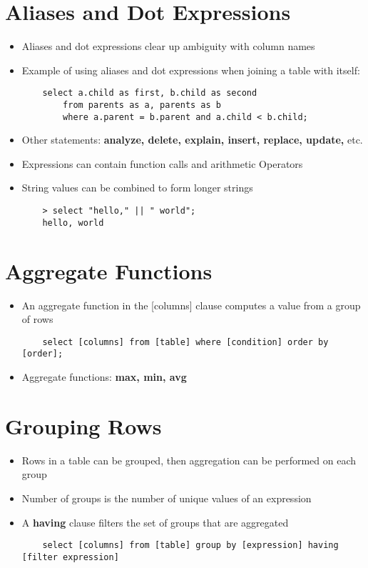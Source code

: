 \section{Aliases and Dot Expressions}
\begin{itemize}
    \item Aliases and dot expressions clear up ambiguity with column names
    \item Example of using aliases and dot expressions when joining a table with itself:
    \begin{verbatim}
    select a.child as first, b.child as second 
        from parents as a, parents as b 
        where a.parent = b.parent and a.child < b.child;
    \end{verbatim}
    \item Other statements: \textbf{analyze, delete, explain, insert, replace, update,} etc.
    \item Expressions can contain function calls and arithmetic Operators
    \item String values can be combined to form longer strings
    \begin{verbatim}
    > select "hello," || " world";
    hello, world
    \end{verbatim}
\end{itemize}

\section{Aggregate Functions}
\begin{itemize}
    \item An aggregate function in the [columns] clause computes a value from a group of rows
    \begin{verbatim}
    select [columns] from [table] where [condition] order by [order];
    \end{verbatim}
    \item Aggregate functions: \textbf{max, min, avg}
\end{itemize}

\section{Grouping Rows}
\begin{itemize}
    \item Rows in a table can be grouped, then aggregation can be performed on each group
    \item Number of groups is the number of unique values of an expression
    \item A \textbf{having} clause filters the set of groups that are aggregated
    \begin{verbatim}
    select [columns] from [table] group by [expression] having [filter expression]
    \end{verbatim}
\end{itemize}